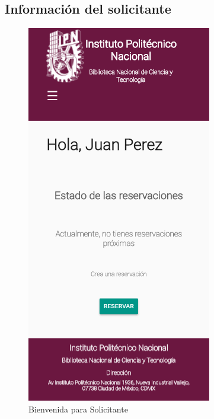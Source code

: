 \subsection{Información del solicitante}
\begin{figure}[hbtp]
		
		\includegraphics[scale=0.3]{images/InterfazMovil/IUGS00_binevenida.png}
		\caption{Bienvenida para Solicitante}
	\end{figure}


